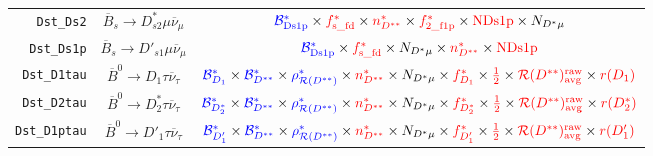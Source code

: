 \begin{landscape}
\begin{table}
\begin{tabular}{r|c|c}
     \texttt{Dst\_Ds2} &           $\overline{B}_s \rightarrow D_{s2}^* \mu \overline{\nu}_\mu$            &                                                                                      $\textcolor{blue}{\mathcal{B}^{*}_\text{Ds1p}} \times \textcolor{red}{f^{*}_\text{s\_fd}} \times \textcolor{red}{n^{*}_{D^{**}}} \times \textcolor{red}{f^{*}_\text{2\_f1p}} \times \textcolor{red}{\text{NDs1p}} \times N_{D^* \mu}$                                                                                      \\
    \texttt{Dst\_Ds1p} &            $\overline{B}_s \rightarrow D'_{s1} \mu \overline{\nu}_\mu$            &                                                                                                            $\textcolor{blue}{\mathcal{B}^{*}_\text{Ds1p}} \times \textcolor{red}{f^{*}_\text{s\_fd}} \times N_{D^* \mu} \times \textcolor{red}{n^{*}_{D^{**}}} \times \textcolor{red}{\text{NDs1p}}$                                                                                                            \\
   \texttt{Dst\_D1tau} &             $\overline{B}^0 \rightarrow D_1 \tau \overline{\nu}_\tau$             &              $\textcolor{blue}{\mathcal{B}^{*}_{D_1}} \times \textcolor{blue}{\mathcal{B}^*_{D^{**}}} \times \textcolor{blue}{\rho_{\mathcal{R}(D^{**})}^*} \times \textcolor{red}{n^{*}_{D^{**}}} \times N_{D^* \mu} \times \textcolor{red}{f^{*}_{D_1}} \times \textcolor{red}{\frac{1}{2}} \times \textcolor{red}{\mathcal{R}(D^{**})_\text{avg}^\text{raw}} \times \textcolor{red}{r({D_1})}$               \\
   \texttt{Dst\_D2tau} &            $\overline{B}^0 \rightarrow D^*_2 \tau \overline{\nu}_\tau$            &           $\textcolor{blue}{\mathcal{B}^{*}_{D_2^*}} \times \textcolor{blue}{\mathcal{B}^*_{D^{**}}} \times \textcolor{blue}{\rho_{\mathcal{R}(D^{**})}^*} \times \textcolor{red}{n^{*}_{D^{**}}} \times N_{D^* \mu} \times \textcolor{red}{f^{*}_{D_2^*}} \times \textcolor{red}{\frac{1}{2}} \times \textcolor{red}{\mathcal{R}(D^{**})_\text{avg}^\text{raw}} \times \textcolor{red}{r({D_2^*})}$            \\
  \texttt{Dst\_D1ptau} &            $\overline{B}^0 \rightarrow D'_1 \tau \overline{\nu}_\tau$             &             $\textcolor{blue}{\mathcal{B}^{*}_{D'_1}} \times \textcolor{blue}{\mathcal{B}^*_{D^{**}}} \times \textcolor{blue}{\rho_{\mathcal{R}(D^{**})}^*} \times \textcolor{red}{n^{*}_{D^{**}}} \times N_{D^* \mu} \times \textcolor{red}{f^{*}_{D'_1}} \times \textcolor{red}{\frac{1}{2}} \times \textcolor{red}{\mathcal{R}(D^{**})_\text{avg}^\text{raw}} \times \textcolor{red}{r({D'_1})}$             \\

\end{tabular}
\end{table}
\end{landscape}
